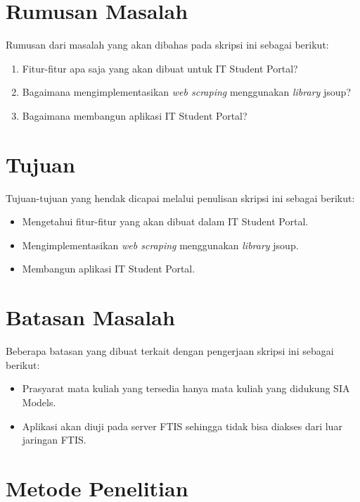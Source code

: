 \section{Rumusan Masalah}
\label{sec:rumusan_masalah}

Rumusan dari masalah yang akan dibahas pada skripsi ini sebagai
berikut:
\begin{enumerate}
	\item Fitur-fitur apa saja yang akan dibuat untuk IT Student Portal?
	\item Bagaimana mengimplementasikan \textit{web scraping} menggunakan \textit{library} jsoup?
	\item Bagaimana membangun aplikasi IT Student Portal?
\end{enumerate}

\section{Tujuan}
\label{sec:tujuan}

Tujuan-tujuan yang hendak dicapai melalui penulisan skripsi ini sebagai berikut:
\begin{itemize}
	\item	Mengetahui fitur-fitur yang akan dibuat dalam IT Student Portal.
	\item	Mengimplementasikan \textit{web scraping} menggunakan \textit{library} jsoup.
	\item Membangun aplikasi IT Student Portal.
\end{itemize}

\section{Batasan Masalah}
\label{sec:batasan_masalah}

Beberapa batasan yang dibuat terkait dengan pengerjaan skripsi ini sebagai berikut:
\begin{itemize}
	\item Prasyarat mata kuliah yang tersedia hanya mata kuliah yang didukung SIA Models.
	\item Aplikasi akan diuji pada server FTIS sehingga tidak bisa diakses dari luar jaringan FTIS.
\end{itemize}

\section{Metode Penelitian}
\label{sec:metode_penelitian}

